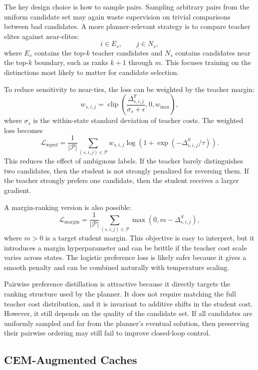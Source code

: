 \documentclass[11pt]{article}
\begin{document}
The key design choice is how to sample pairs. Sampling arbitrary pairs from the uniform candidate set may again waste supervision on trivial comparisons between bad candidates. A more planner-relevant strategy is to compare teacher elites against near-elites:
\[
    i \in E_s,
    \qquad
    j \in N_s,
\]
where \(E_s\) contains the top-\(k\) teacher candidates and \(N_s\) contains candidates near the top-\(k\) boundary, such as ranks \(k+1\) through \(m\). This focuses training on the distinctions most likely to matter for candidate selection.

To reduce sensitivity to near-ties, the loss can be weighted by the teacher margin:
\[
    w_{s,i,j}
    =
    \operatorname{clip}
    \left(
        \frac{\Delta^T_{s,i,j}}{\sigma_s + \epsilon},
        0,
        w_{\max}
    \right),
\]
where \(\sigma_s\) is the within-state standard deviation of teacher costs. The weighted loss becomes
\[
    \mathcal{L}_{\mathrm{wpref}}
    =
    \frac{1}{|\mathcal{P}|}
    \sum_{(s,i,j)\in\mathcal{P}}
    w_{s,i,j}
    \log
    \left(
        1 + \exp\left(-\Delta^S_{s,i,j}/\tau\right)
    \right).
\]
This reduces the effect of ambiguous labels. If the teacher barely distinguishes two candidates, then the student is not strongly penalized for reversing them. If the teacher strongly prefers one candidate, then the student receives a larger gradient.

A margin-ranking version is also possible:
\[
    \mathcal{L}_{\mathrm{margin}}
    =
    \frac{1}{|\mathcal{P}|}
    \sum_{(s,i,j)\in\mathcal{P}}
    \max
    \left(
        0,
        m - \Delta^S_{s,i,j}
    \right),
\]
where \(m>0\) is a target student margin. This objective is easy to interpret, but it introduces a margin hyperparameter and can be brittle if the teacher cost scale varies across states. The logistic preference loss is likely safer because it gives a smooth penalty and can be combined naturally with temperature scaling.

Pairwise preference distillation is attractive because it directly targets the ranking structure used by the planner. It does not require matching the full teacher cost distribution, and it is invariant to additive shifts in the student cost. However, it still depends on the quality of the candidate set. If all candidates are uniformly sampled and far from the planner's eventual solution, then preserving their pairwise ordering may still fail to improve closed-loop control.

\subsection{CEM-Augmented Caches}
\label{sec:cem_augmented_caches}
\end{document}
